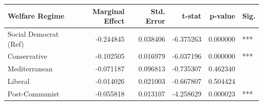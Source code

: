 \begin{tabular}{lrrrrl}
\toprule
Welfare Regime & Marginal Effect & Std. Error & t-stat & p-value & Sig. \\
\midrule
Social Democrat (Ref) & -0.244845 & 0.038406 & -6.375263 & 0.000000 & *** \\
Conservative & -0.102505 & 0.016979 & -6.037196 & 0.000000 & *** \\
Mediterranean & -0.071187 & 0.096813 & -0.735307 & 0.462340 &  \\
Liberal & -0.014026 & 0.021003 & -0.667807 & 0.504424 &  \\
Post-Communist & -0.055818 & 0.013107 & -4.258629 & 0.000023 & *** \\
\bottomrule
\end{tabular}
